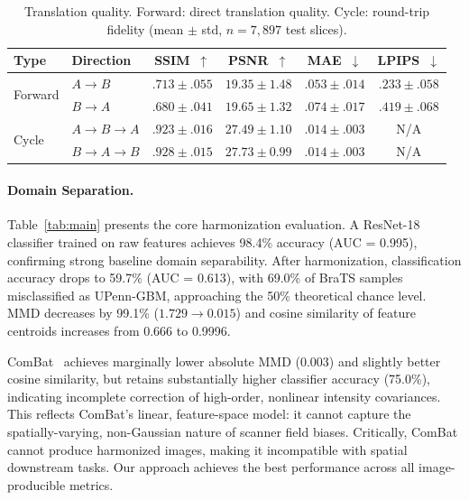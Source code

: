 \documentclass{article}
\begin{document}
\begin{table}[t]
  \centering
  \caption{Translation quality. Forward: direct translation quality.
    Cycle: round-trip fidelity (mean $\pm$ std, $n{=}7{,}897$ test slices).}
  \label{tab:quality}
  \small
  \begin{tabular}{llcccc}
    \toprule
    Type & Direction & SSIM~$\uparrow$ & PSNR~$\uparrow$ & MAE~$\downarrow$ & LPIPS~$\downarrow$ \\
    \midrule
    \multirow{2}{*}{Forward}
      & $A {\to} B$ & $.713 \pm .055$ & $19.35 \pm 1.48$ & $.053 \pm .014$ & $.233 \pm .058$ \\
      & $B {\to} A$ & $.680 \pm .041$ & $19.65 \pm 1.32$ & $.074 \pm .017$ & $.419 \pm .068$ \\
    \midrule
    \multirow{2}{*}{Cycle}
      & $A {\to} B {\to} A$ & $.923 \pm .016$ & $27.49 \pm 1.10$ & $.014 \pm .003$ & N/A \\
      & $B {\to} A {\to} B$ & $.928 \pm .015$ & $27.73 \pm 0.99$ & $.014 \pm .003$ & N/A \\
    \bottomrule
  \end{tabular}
\end{table}

\paragraph{Domain Separation.}
Table~\ref{tab:main} presents the core harmonization evaluation. A ResNet-18 classifier
trained on raw features achieves 98.4\% accuracy (AUC = 0.995), confirming strong
baseline domain separability. After harmonization, classification accuracy drops to 59.7\%
(AUC = 0.613), with 69.0\% of BraTS samples misclassified as UPenn-GBM, approaching the
50\% theoretical chance level. MMD decreases by 99.1\% ($1.729 \to 0.015$) and cosine
similarity of feature centroids increases from 0.666 to 0.9996.

ComBat~\cite{johnson2007combat,fortin2017harmonization} achieves marginally lower absolute
MMD (0.003) and slightly better cosine similarity, but retains substantially higher
classifier accuracy (75.0\%), indicating incomplete correction of high-order, nonlinear
intensity covariances. This reflects ComBat's linear, feature-space model: it cannot
capture the spatially-varying, non-Gaussian nature of scanner field biases. Critically,
ComBat cannot produce harmonized images, making it incompatible with spatial downstream
tasks. Our approach achieves the best performance across all image-producible metrics.
\end{document}
